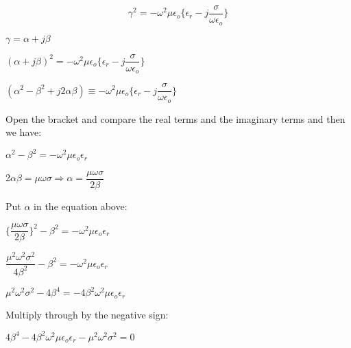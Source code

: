 \begin{equation}
\gamma^{2} = -\omega^{2}\mu\epsilon_{o}\bigg\{\epsilon_{r} - j \dfrac{\sigma}{\omega\epsilon_{o}}\bigg\}
\end{equation}

\begin{center}
$\gamma = \alpha + j\beta$
\end{center}

\begin{center}
$(\alpha + j\beta)^{2} = -\omega^{2}\mu\epsilon_{o}\bigg\{\epsilon_{r} - j \dfrac{\sigma}{\omega\epsilon_{o}}\bigg\}$
\end{center}

\begin{center}
$(\alpha^{2} - \beta^{2} + j2\alpha\beta) \equiv -\omega^{2}\mu\epsilon_{o}\bigg\{\epsilon_{r} - j \dfrac{\sigma}{\omega\epsilon_{o}}\bigg\}$
\end{center}

Open the bracket and compare the real terms and the imaginary terms and then we have:

\begin{center}
$\alpha^{2} - \beta^{2} = -\omega^{2}\mu\epsilon_{o}\epsilon_{r}$
\end{center}

\begin{center}
2$\alpha\beta = \mu\omega\sigma\Rightarrow \alpha = \dfrac{\mu\omega\sigma}{2\beta}$ 
\end{center}

Put $\alpha$ in the equation above:

\begin{center}
$\bigg\{\dfrac{\mu\omega\sigma}{2\beta}\bigg\}^{2} - \beta^{2} = -\omega^{2}\mu\epsilon_{o}\epsilon_{r}$
\end{center}

\begin{center}
$\dfrac{\mu^{2}\omega^{2}\sigma^{2}}{4\beta^{2}} - \beta^{2} = -\omega^{2}\mu\epsilon_{o}\epsilon_{r}$
\end{center}

\begin{center}
$\mu^{2}\omega^{2}\sigma^{2} - 4\beta^{4} = -4\beta^{2}\omega^{2}\mu\epsilon_{o}\epsilon_{r}$
\end{center}

Multiply through by the negative sign:

\begin{center}
$4\beta^{4} -4\beta^{2}\omega^{2}\mu\epsilon_{o}\epsilon_{r} - \mu^{2}\omega^{2}\sigma^{2} = 0$
\end{center}

